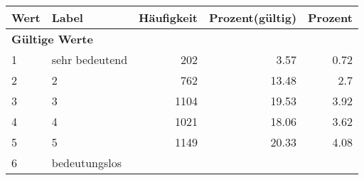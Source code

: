      \begin{longtable}{lXrrr}
     \toprule
     \textbf{Wert} & \textbf{Label} & \textbf{Häufigkeit} & \textbf{Prozent(gültig)} & \textbf{Prozent} \\
     \endhead
     \midrule
     \multicolumn{5}{l}{\textbf{Gültige Werte}}\\

     1 &
     \multicolumn{1}{X}{ sehr bedeutend   } &


       \num{202} &
       \num[round-mode=places,round-precision=2]{3.57} &
         \num[round-mode=places,round-precision=2]{0.72} \\

     2 &
     \multicolumn{1}{X}{ 2   } &


       \num{762} &
       \num[round-mode=places,round-precision=2]{13.48} &
         \num[round-mode=places,round-precision=2]{2.7} \\

     3 &
     \multicolumn{1}{X}{ 3   } &


       \num{1104} &
       \num[round-mode=places,round-precision=2]{19.53} &
         \num[round-mode=places,round-precision=2]{3.92} \\

     4 &
     \multicolumn{1}{X}{ 4   } &


       \num{1021} &
       \num[round-mode=places,round-precision=2]{18.06} &
         \num[round-mode=places,round-precision=2]{3.62} \\

     5 &
     \multicolumn{1}{X}{ 5   } &


       \num{1149} &
       \num[round-mode=places,round-precision=2]{20.33} &
         \num[round-mode=places,round-precision=2]{4.08} \\

     6 &
     \multicolumn{1}{X}{ bedeutungslos   } &



\end{longtable}
